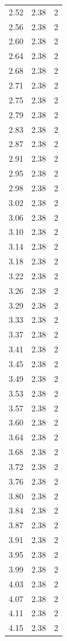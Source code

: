 \begin{longtable}{lrr}
  2.52 & 2.38 & 2 \\
  2.56 & 2.38 & 2 \\
  2.60 & 2.38 & 2 \\
  2.64 & 2.38 & 2 \\
  2.68 & 2.38 & 2 \\
  2.71 & 2.38 & 2 \\
  2.75 & 2.38 & 2 \\
  2.79 & 2.38 & 2 \\
  2.83 & 2.38 & 2 \\
  2.87 & 2.38 & 2 \\
  2.91 & 2.38 & 2 \\
  2.95 & 2.38 & 2 \\
  2.98 & 2.38 & 2 \\
  3.02 & 2.38 & 2 \\
  3.06 & 2.38 & 2 \\
  3.10 & 2.38 & 2 \\
  3.14 & 2.38 & 2 \\
  3.18 & 2.38 & 2 \\
  3.22 & 2.38 & 2 \\
  3.26 & 2.38 & 2 \\
  3.29 & 2.38 & 2 \\
  3.33 & 2.38 & 2 \\
  3.37 & 2.38 & 2 \\
  3.41 & 2.38 & 2 \\
  3.45 & 2.38 & 2 \\
  3.49 & 2.38 & 2 \\
  3.53 & 2.38 & 2 \\
  3.57 & 2.38 & 2 \\
  3.60 & 2.38 & 2 \\
  3.64 & 2.38 & 2 \\
  3.68 & 2.38 & 2 \\
  3.72 & 2.38 & 2 \\
  3.76 & 2.38 & 2 \\
  3.80 & 2.38 & 2 \\
  3.84 & 2.38 & 2 \\
  3.87 & 2.38 & 2 \\
  3.91 & 2.38 & 2 \\
  3.95 & 2.38 & 2 \\
  3.99 & 2.38 & 2 \\
  4.03 & 2.38 & 2 \\
  4.07 & 2.38 & 2 \\
  4.11 & 2.38 & 2 \\
  4.15 & 2.38 & 2 \\

\end{longtable}
